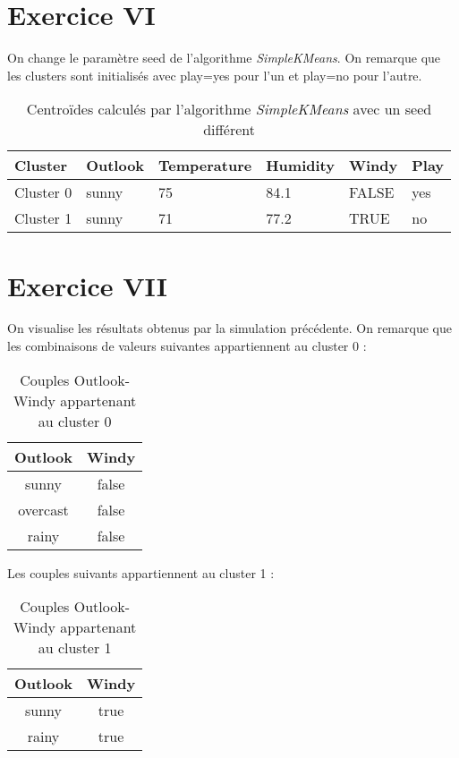 \documentclass[a4paper, 11pt]{report}
\begin{document}
        \section{Exercice VI}
        On change le paramètre seed de l'algorithme \emph{SimpleKMeans}. On remarque que les clusters sont initialisés avec play=yes pour l'un et play=no pour l'autre.
        \begin{table}[h!]
        \centering
        \begin{tabular}{| l | l | l | l | l | l |}
        \hline
        Cluster & Outlook & Temperature & Humidity & Windy & Play \\
        \hline
        Cluster 0 & sunny & 75 & 84.1 & FALSE & yes \\
        \hline
        Cluster 1 & sunny & 71 & 77.2 & TRUE & no \\
        \hline

        \end{tabular}
        \caption{Centroïdes calculés par l'algorithme \emph{SimpleKMeans} avec un seed différent}
        \label{tab:exo_6}
        \end{table}
        
        \section{Exercice VII}
        On visualise les résultats obtenus par la simulation précédente. On remarque que les combinaisons de valeurs suivantes appartiennent au cluster 0 :
        \begin{table}[h!]
        \centering
        \begin{tabular}{| c | c |}
         \hline
         Outlook & Windy \\
         \hline
         sunny & false \\
         overcast & false \\
         rainy & false \\
         \hline
        
        \end{tabular}
        \caption{Couples Outlook-Windy appartenant au cluster 0}
        \label{tab:exo7_1}
        \end{table}
        
        Les couples suivants appartiennent au cluster 1 : 
        \begin{table}[h!]
        \centering
        \begin{tabular}{| c | c |}
         \hline
         Outlook & Windy \\
         \hline
         sunny & true \\
         rainy & true \\
         \hline
        
        \end{tabular}
        \caption{Couples Outlook-Windy appartenant au cluster 1}
        \label{tab:exo7_2}
        \end{table}
\end{document}
